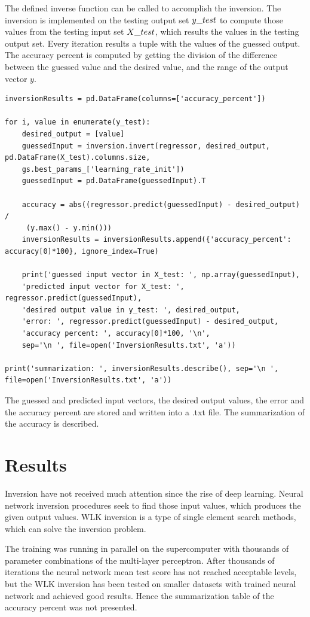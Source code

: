 \medskip The defined inverse function can be called to accomplish the inversion. The inversion is implemented on the testing output set $y\char`_test$ to compute those values from the testing input set $X\char`_test$, which results the values in the testing output set. Every iteration results a tuple with the values of the guessed output.\\
The accuracy percent is computed by getting the division of the difference between the guessed value and the desired value, and the range of the output vector $y$. 
\begin{lstlisting}
inversionResults = pd.DataFrame(columns=['accuracy_percent'])

for i, value in enumerate(y_test):
	desired_output = [value]
	guessedInput = inversion.invert(regressor, desired_output, pd.DataFrame(X_test).columns.size,
	gs.best_params_['learning_rate_init'])
	guessedInput = pd.DataFrame(guessedInput).T

	accuracy = abs((regressor.predict(guessedInput) - desired_output) /
	 (y.max() - y.min()))
	inversionResults = inversionResults.append({'accuracy_percent': accuracy[0]*100}, ignore_index=True)

	print('guessed input vector in X_test: ', np.array(guessedInput),
	'predicted input vector for X_test: ', regressor.predict(guessedInput),
	'desired output value in y_test: ', desired_output,
	'error: ', regressor.predict(guessedInput) - desired_output,
	'accuracy percent: ', accuracy[0]*100, '\n',
	sep='\n ', file=open('InversionResults.txt', 'a'))

print('summarization: ', inversionResults.describe(), sep='\n ', file=open('InversionResults.txt', 'a'))
\end{lstlisting}
The guessed and predicted input vectors, the desired output values, the error and the accuracy percent are stored and written into a .txt file. The summarization of the accuracy is described.


\section{Results}

Inversion have not received much attention since the rise of deep learning. Neural network inversion procedures seek to find those input values, which produces the given output values. WLK inversion is a type of single element search methods, which can solve the inversion problem.\medskip

The training was running in parallel on the supercomputer with thousands of parameter combinations of the multi-layer perceptron. After thousands of iterations the neural network mean test score has not reached acceptable levels, but the WLK inversion has been tested on smaller datasets with trained neural network and achieved good results. Hence the summarization table of the accuracy percent was not presented. \medskip

